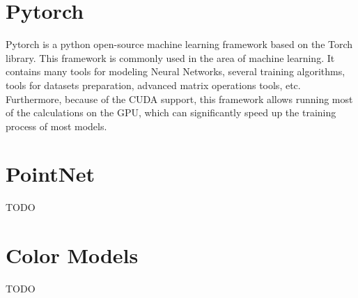 \section{Pytorch}

Pytorch is a python open-source machine learning framework based on the Torch library. This framework is commonly used in the area of machine learning. It contains many tools for modeling Neural Networks, several training algorithms, tools for datasets preparation, advanced matrix operations tools, etc. Furthermore, because of the CUDA support, this framework allows running most of the calculations on the GPU, which can significantly speed up the training process of most models.

\section{PointNet}

TODO

\section{Color Models}

TODO
